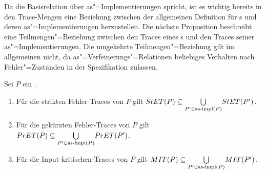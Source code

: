 Da die Basisrelation über as"=Implementierungen spricht, ist es wichtig bereits
in den Trace-Mengen eine Beziehung zwischen der allgemeinen Definition für
\MEIO{}s und deren as"=Implementierungen herzustellen. Die nächste Proposition
beschreibt eine Teilmengen"=Beziehung zwischen den Traces eines \MEIO{}s und
den Traces seiner as"=Implementierungen. Die umgekehrte Teilmengen"=Beziehung
gilt im allgemeinen nicht, da as"=Verfeinerungs"=Relationen beliebiges
Verhalten nach Fehler"=Zuständen in der Spezifikation zulassen.

\begin{Prop}
  \label{KommTracesProp}
  Sei $P$ ein \MEIO{}.
  \begin{enumerate}
    \item Für die strikten Fehler-Traces von $P$ gilt $StET (P) \subseteq
      \underset{P' \in\mathrm{as}\text{-}\mathrm{impl} (P)}{\bigcup} StET (P')$.
    \item Für die gekürzten Fehler-Traces von $P$ gilt $PrET (P) \subseteq
      \underset{P' \in\mathrm{as}\text{-}\mathrm{impl} (P)}{\bigcup} PrET (P')$.
    \item Für die Input-kritischen-Traces von $P$ gilt $MIT (P) \subseteq
      \underset{P' \in\mathrm{as}\text{-}\mathrm{impl} (P)}{\bigcup} MIT (P')$.
  \end{enumerate}
\end{Prop}
